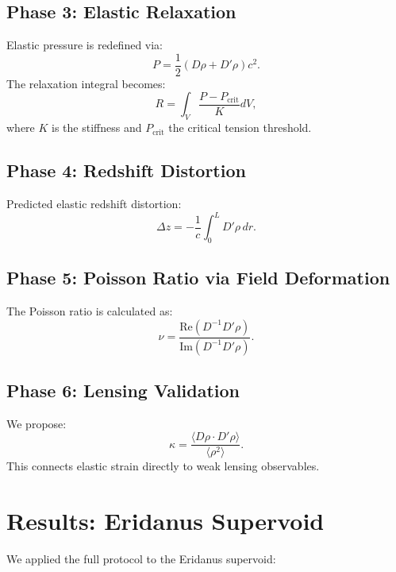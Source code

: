 \documentclass[twocolumn]{aastex631}
\begin{document}
\subsection{Phase 3: Elastic Relaxation}
Elastic pressure is redefined via:
\begin{equation}
    P = \frac{1}{2} (D\rho + D'\rho)c^2.
\end{equation}
The relaxation integral becomes:
\begin{equation}
    R = \int_V \frac{P - P_{\text{crit}}}{K} dV,
\end{equation}
where $K$ is the stiffness and $P_{\text{crit}}$ the critical tension threshold.

\subsection{Phase 4: Redshift Distortion}
Predicted elastic redshift distortion:
\begin{equation}
    \Delta z = -\frac{1}{c} \int_0^L D'\rho\, dr.
\end{equation}

\subsection{Phase 5: Poisson Ratio via Field Deformation}
The Poisson ratio is calculated as:
\begin{equation}
    \nu = \frac{\text{Re}(D^{-1}D'\rho)}{\text{Im}(D^{-1}D'\rho)}.
\end{equation}

\subsection{Phase 6: Lensing Validation}
We propose:
\begin{equation}
    \kappa = \frac{\langle D\rho \cdot D'\rho \rangle}{\langle \rho^2 \rangle}.
\end{equation}
This connects elastic strain directly to weak lensing observables.

\section{Results: Eridanus Supervoid}
We applied the full protocol to the Eridanus supervoid:
\end{document}
